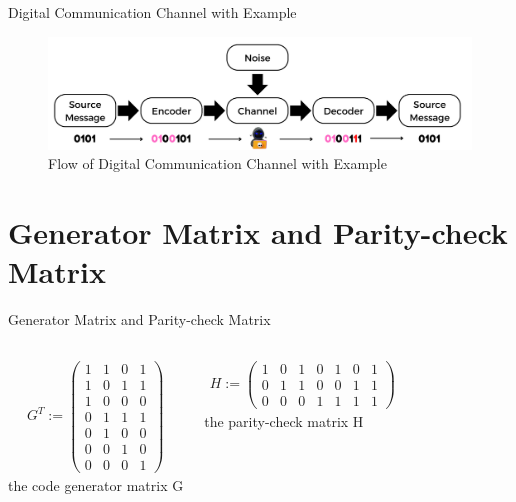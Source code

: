 \documentclass[10pt]{beamer}
\begin{document}
\begin{frame}{Digital Communication Channel with Example}
    \begin{figure}
        \includegraphics[width=\textwidth]{channel_e.pdf}
        \caption{Flow of Digital Communication Channel with Example}
    \end{figure}
\end{frame}

\section{Generator Matrix and Parity-check Matrix}
\begin{frame}{Generator Matrix and Parity-check Matrix}
    \begin{columns}
            \begin{align*}
                G^T := 
                \begin{pmatrix}
                1&1&0&1\\
                1&0&1&1\\
                1&0&0&0\\
                0&1&1&1\\
                0&1&0&0\\
                0&0&1&0\\
                0&0&0&1
                \end{pmatrix}
            \end{align*}
            the code generator matrix G
            
            \begin{align*}
                H := 
                \begin{pmatrix}
                1&0&1&0&1&0&1\\
                0&1&1&0&0&1&1\\
                0&0&0&1&1&1&1
                \end{pmatrix}
            \end{align*}
            the parity-check matrix H
    \end{columns}
\end{frame}
\end{document}
